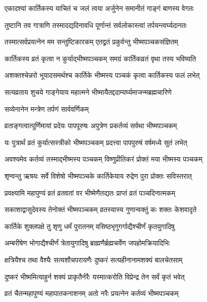\twolineshloka
{एकादश्यां कार्तिकस्य याचितं च जलं त्वया}
{अर्जुनेन समानीतं गाङ्गं बाणस्य वेगतः} %

\twolineshloka
{तुष्टानि तव गात्राणि तस्मादद्यदिनावधि}
{पूर्णान्तं सर्वलोकास्त्वां तर्पयन्त्वर्घ्यदानतः} %

\twolineshloka
{तस्मात्सर्वप्रयत्नेन मम सन्तुष्टिकारकम्}
{एतद्व्रतं प्रकुर्वन्तु भीष्मपञ्चकसंज्ञितम्} %

\twolineshloka
{कार्तिकस्य व्रतं कृत्वा न कुर्याद्भीष्मपञ्चकम्}
{समग्रं कार्तिकव्रतं वृथा तस्य भविष्यति} %

\twolineshloka
{अशक्तश्चेन्नरो भूयादसमर्थश्च कार्तिके}
{भीष्मस्य पञ्चकं कृत्वा कार्तिकस्य फलं लभेत्} %

\twolineshloka
{सत्यव्रताय शुचये गाङ्गेयाय महात्मने}
{भीष्मायैतद्ददाम्यर्घ्यमाजन्मब्रह्मचारिणे} %


\onelineshloka
{सव्येनानेन मन्त्रेण तर्पणं सार्ववर्णिकम्} %

\twolineshloka
{व्रताङ्गत्वात्पूर्णिमायां प्रदेयः पापपूरुषः}
{अपुत्रेण प्रकर्तव्यं सर्वथा भीष्मपञ्चकम्} %

\twolineshloka
{यः पुत्रार्थं व्रतं कुर्यात्सस्त्रीको भीष्मपञ्चकम्}
{प्रदत्त्वा पापपुरुषं वर्षमध्ये सुतं लभेत्} %

\twolineshloka
{अवश्यमेव कर्तव्यं तस्माद्भीष्मस्य पञ्चकम्}
{विष्णुप्रीतिकरं प्रोक्तं मया भीष्मस्य पञ्चकम्} %


\twolineshloka
{शृण्वन्तु ऋषयः सर्वे विशेषो भीष्मपञ्चके}
{कार्तिकेयाय रुद्रेण पुरा प्रोक्तः सविस्तरात्} %


\twolineshloka
{प्रवक्ष्यामि महापुण्यं व्रतं व्रतवतां वर}
{भीष्मेणैतद्यतः प्राप्तं व्रतं पञ्चदिनात्मकम्} %

\twolineshloka
{सकाशाद्वासुदेवस्य तेनोक्तं भीष्मपञ्चकम्}
{व्रतस्यास्य गुणान्वक्तुं कः शक्तः केशवादृते} %

\twolineshloka
{कार्तिके शुक्लपक्षे तु शृणु धर्मं पुरातनम्}
{वसिष्ठभृगुगर्गाद्यैश्चीर्णं कृतयुगादिषु} %

\twolineshloka
{अम्बरीषेण भोगाद्यैश्चीर्णं त्रेतायुगादिषु}
{ब्राह्मणैर्ब्रह्मचर्येण जपहोमक्रियादिभिः} %

\twolineshloka
{क्षत्रियैश्च तथा वैश्यैः सत्यशौचपरायणैः}
{दुष्करं सत्यहीनानामशक्यं बालचेतसाम्} %

\twolineshloka
{दुष्करं भीष्ममित्याहुर्न शक्यं प्राकृतैर्नरैः}
{यस्मात्करोति विप्रेन्द्र तेन सर्वं कृतं भवेत्} %

\twolineshloka
{व्रतं चैतन्महापुण्यं महापातकनाशनम्}
{अतो नरैः प्रयत्नेन कर्तव्यं भीष्मपञ्चकम्} %

